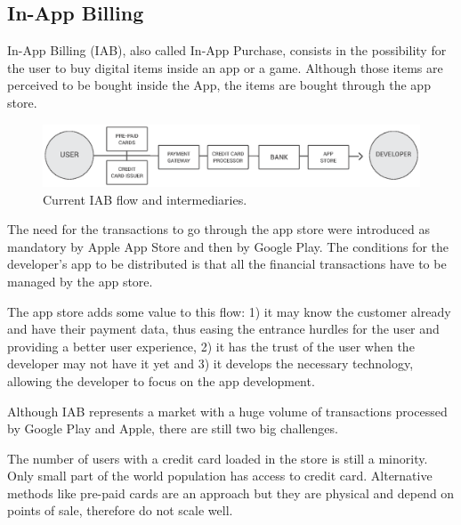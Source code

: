 \subsection{In-App Billing}
\label{subsec:intro_iab}


In-App Billing (IAB), also called In-App Purchase, consists in the possibility for the user to buy digital items inside an app or a game. Although those items are perceived to be bought inside the App, the items are bought through the app store.

\begin{figure}[!ht]
\centering
\includegraphics[width=\textwidth]{diagrams/iab_flow.eps}
\caption{Current IAB flow and intermediaries.}
\label{fig:iab_flow}
\end{figure}


The need for the transactions to go through the app store were introduced as mandatory by Apple App Store and then by Google Play. The conditions for the developer's app to be distributed is that all the financial transactions have to be managed by the app store. 

The app store adds some value to this flow: 1) it may know the customer already and have their payment data, thus easing the entrance hurdles for the user and providing a better user experience, 2) it has the trust of the user when the developer may not have it yet and 3) it develops the necessary technology, allowing the developer to focus on the app development.

Although IAB represents a market with a huge volume of transactions processed by Google Play and Apple, there are still two big challenges.


The number of users with a credit card loaded in the store is still a minority. Only small part of the world population has access to credit card. Alternative methods like pre-paid cards are an approach but they are physical and depend on points of sale, therefore do not scale well.


